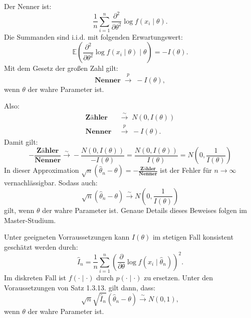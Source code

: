 \documentclass[10pt]{article}
\newcommand{\EW}{\mathbb{E}} %
\newcommand{\KW}{\overset{p} \longrightarrow} %
\newcommand{\KV}{\overset{\sim} \longrightarrow} %
\newcommand{\ablt}{\frac{\partial}{\partial \theta}}
\newenvironment{BWS}[1][]
{\begin{Beweis}[frametitle=#1]}{\end{Beweis}}
\begin{document}
\begin{BWS}[Beweisidee 1.3.6 (Verteilung des Schätzfehlers)]
		Der Nenner ist:
		\begin{equation*}
			\frac{1}{n} \sum_{i=1}^{n} \frac{\partial^2}{\partial \theta^2} \log f(x_i \mid \theta).
		\end{equation*}
		Die Summanden sind i.i.d. mit folgenden Erwartungswert:
		\begin{equation*}
			\EW \left(\frac{\partial^2}{\partial \theta^2} \log f(x_i \mid \theta) \mid \theta \right) = -I(\theta).
		\end{equation*}
		Mit dem Gesetz der großen Zahl gilt:
		\begin{equation*}
			\textbf{Nenner} \; \KW \; -I(\theta),
		\end{equation*}
		wenn $\theta$ der wahre Parameter ist. 
		
		Also: 
		\begin{equation*}
			\begin{split}
				\textbf{Zähler} \; &\KV \; N(0,I(\theta))\\
				\textbf{Nenner} \; &\KW \; -I(\theta).
			\end{split}
		\end{equation*}
		Damit gilt:
		\begin{equation*}
			- \frac{\textbf{Zähler}}{\textbf{Nenner}} \KV -\frac{N(0,I(\theta))}{-I(\theta)} = \frac{N(0, I(\theta))}{I(\theta)} = N\left(0, \frac{1}{I(\theta)}\right)
		\end{equation*}
		In dieser Approximation $\sqrt{n}(\hat{\theta}_n - \theta) = - \frac{\textbf{Zähler}}{\textbf{Nenner}}$ ist der Fehler für $n \rightarrow \infty$ vernachlässigbar. Sodass auch:
		\begin{equation*}
			\sqrt{n}(\hat{\theta}_n - \theta)  \KV N\left(0, \frac{1}{I(\theta)}\right)
		\end{equation*}
		gilt, wenn $\theta$ der wahre Parameter ist. Genaue Details dieses Beweises folgen im Master-Studium. 
	\end{BWS}
	Unter geeigneten Vorraussetzungen kann $I(\theta)$ im stetigen Fall konsistent geschätzt werden durch:
	\begin{equation*}
		\hat{I}_n = \frac{1}{n} \sum_{i=1}^{n}\left(\ablt \log f(x_i\mid \hat{\theta}_n)\right)^2.
	\end{equation*}
	Im diskreten Fall ist $f(\cdot \mid \cdot)$ durch $p(\cdot \mid \cdot)$ zu ersetzen.
	Unter den Voraussetzungen von Satz 1.3.13. gilt dann, dass:
	\begin{equation*}
		\sqrt{n} \sqrt{\hat{I}_n}(\hat{\theta}_n - \theta) \KV N(0,1),
	\end{equation*}
	wenn $\theta$ der wahre Parameter ist. 
	
\end{document}
